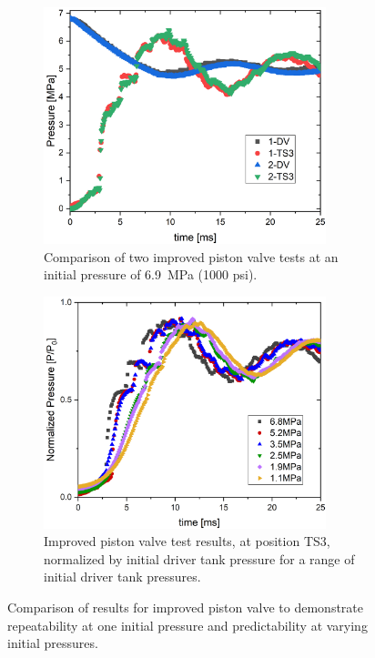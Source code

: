 \begin{figure}[bt]
    \centering
    \begin{subfigure}[t]{0.45\textwidth}
        \centering
        \includegraphics[width=0.9\textwidth]{results/plots/1000psi_FFKM_Piston_2.png}
        \caption{Comparison of two improved piston valve tests at an initial pressure of \SI{6.9}{\mega\pascal} (1000 psi).}
        \label{fig:new piston 2 test}
    \end{subfigure}
    \hfill
    \begin{subfigure}[t]{0.45\textwidth}
        \centering
        \includegraphics[width=0.9\textwidth]{results/plots/Normalized_TS3_oring.png}
        \caption{Improved piston valve test results, at position TS3, normalized by initial driver tank pressure for a range of initial driver tank pressures.}
        \label{fig:new norm}
    \end{subfigure}
    \caption{Comparison of results for improved piston valve to demonstrate repeatability at one initial pressure and predictability at varying initial pressures.}
    \label{fig:new piston repeatability}
\end{figure}

